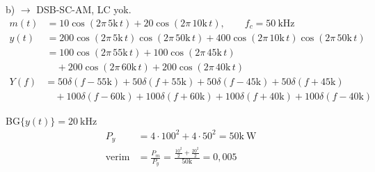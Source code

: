 \documentclass[11pt,a4paper]{article}
\begin{document}
\noindent b) $\rightarrow$ DSB-SC-AM, LC yok.
\begin{align*}
m(t)&=10\cos(2\pi\,5\mathrm{k}\,t)+20\cos(2\pi\,10\mathrm{k}\,t),\qquad f_c=50\ \mathrm{kHz}\\
y(t)&=200\cos(2\pi\,5\mathrm{k}\,t)\cos(2\pi\,50\mathrm{k}\,t)+400\cos(2\pi\,10\mathrm{k}\,t)\cos(2\pi\,50\mathrm{k}\,t)\\
 &=100\cos(2\pi\,55\mathrm{k}\,t)+100\cos(2\pi\,45\mathrm{k}\,t)\\
 &\quad+200\cos(2\pi\,60\mathrm{k}\,t)+200\cos(2\pi\,40\mathrm{k}\,t)
\end{align*}
\begin{align*}
Y(f)&=50\delta(f-55\mathrm{k})+50\delta(f+55\mathrm{k})+50\delta(f-45\mathrm{k})+50\delta(f+45\mathrm{k})\\
&\quad+100\delta(f-60\mathrm{k})+100\delta(f+60\mathrm{k})+100\delta(f+40\mathrm{k})+100\delta(f-40\mathrm{k})
\end{align*}
\begin{center}
\end{center}
\noindent BG$\{y(t)\}=20\ \mathrm{kHz}$
\begin{align*}
P_y &= 4\cdot100^2+4\cdot50^2 = 50\mathrm{k}\ \mathrm{W}\\
\text{verim} &= \frac{P_m}{P_y}=\frac{\frac{10^2}{2}+\frac{20^2}{2}}{50\mathrm{k}}=0{,}005
\end{align*}
\end{document}
